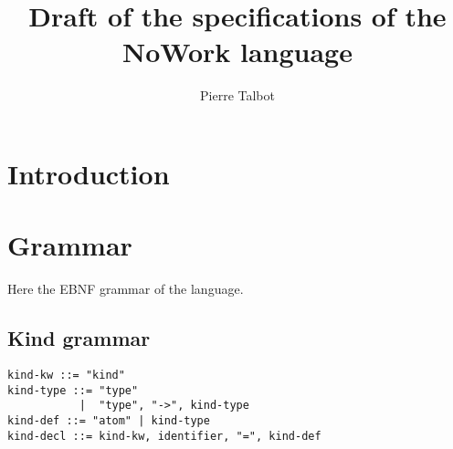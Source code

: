 \documentclass[a4paper,10pt]{article}
\title{Draft of the specifications of the NoWork language}
\author{Pierre Talbot}
\begin{document}
\maketitle
\setcounter{tocdepth}{1}
\tableofcontents

\section{Introduction}

\section{Grammar}

Here the EBNF grammar of the language.

\subsection{Kind grammar}
\begin{lstlisting}
kind-kw ::= "kind"
kind-type ::= "type"
           |  "type", "->", kind-type
kind-def ::= "atom" | kind-type
kind-decl ::= kind-kw, identifier, "=", kind-def
\end{lstlisting}

\newpage


\end{document}
